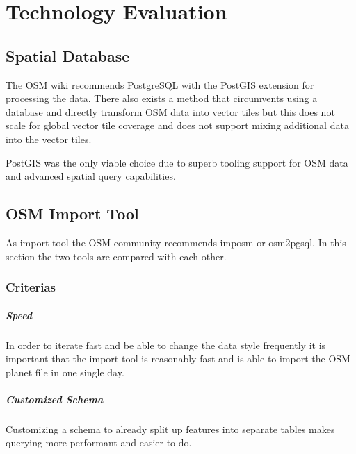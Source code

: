 \chapter{Technology Evaluation}\label{technology_evaluation}

\section{Spatial Database}\label{spatial_database}

The OSM wiki\cite{1_wiki.openstreetmap.org_2015} recommends PostgreSQL with the PostGIS extension for processing the data. There also exists a method\cite{2_github_2015} that circumvents using a database and directly transform OSM data into vector tiles but this does not scale for global vector tile coverage and does not support mixing additional data into the vector tiles.

\begin{tcolorbox}[arc=0mm,boxrule=1pt,title=Decision]\label{spatial_db_decision}
PostGIS was the only viable choice due to superb tooling support for OSM data and
advanced spatial query capabilities.
\end{tcolorbox}

\section{OSM Import Tool}\label{osm_import_tool}
As import tool the OSM community recommends imposm\cite{3_imposm.org_2015} or osm2pgsql\cite{4_wiki.openstreetmap.org_2015}.
In this section the two tools are compared with each other.

\subsection{Criterias}\label{criterias}

\paragraph{Speed} 
In order to iterate fast and be able to change the data style frequently
it is important that the import tool is reasonably fast and is able
to import the OSM planet file in one single day.

\paragraph{Customized Schema}
Customizing a schema to already split up features into separate tables
makes querying more performant and easier to do.

